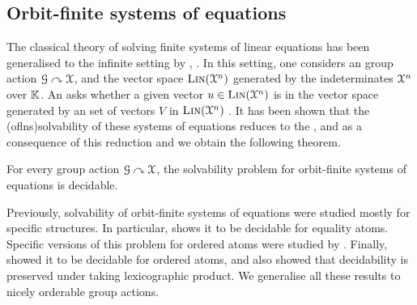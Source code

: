 \subsection{Orbit-finite systems of equations} \AP The classical theory of
solving finite systems of linear equations has been generalised to the infinite
setting by \cite{GHL22}, \cite[Section 9]{GHOLAS24}. In this setting, one
considers an  group action $\mathcal{G}\curvearrowright\mathcal{X}$,
and the vector space $\textsc{Lin}(\mathcal{X}^n)$ generated by the indeterminates
$\mathcal{X}^n$ over $\mathbb{K}$. An  asks
whether a given vector $u \in \textsc{Lin}(\mathcal{X}^n)$ is in the vector space generated
by an  set of vectors $V$ in $\textsc{Lin}(\mathcal{X}^n)$ \cite[Section
9]{GHOLAS24}. It has been shown that the \intro(oflns){solvability} of these
systems of equations reduces to the 
\cite[Theorem 68]{GHOLAS24}, and as a consequence of this reduction and
 we obtain the following theorem.
%
\begin{theorem}[name={Solvability of Orbit-Finite Systems of Equations},
  restate=cor:lin-solv]
  \label{cor:lin solv}
  For every  group action $\mathcal{G}\curvearrowright\mathcal{X}$,
  the solvability problem for orbit-finite systems of equations
  is decidable.
\end{theorem}
%
Previously,
solvability of orbit-finite systems of equations were studied mostly for specific structures.
In particular, \cite[Theorem 6.1]{GHL22} shows it to be decidable for equality atoms.
Specific versions of this problem for ordered atoms were studied by \cite{HL18}.
Finally, \cite{GHOLAS24} showed it to be decidable for ordered atoms,
and also showed that decidability is preserved under taking lexicographic product.
We generalise all these results to nicely orderable group actions.